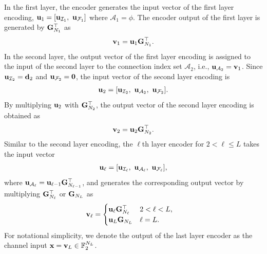 \documentclass[conference]{IEEEtran}
\begin{document}


 In the first layer, the encoder generates the input vector of the first layer encoding, ${\bf u}_{1}=[  {\bf u}_{\mathcal{I}_{1}},~{\bf u}_{\mathcal{F}_{1}} ]$ where $\mathcal{A}_1=\phi$. The encoder output of the first layer is generated by ${\bf G}_{N_{1}}^{\top}$ as
\begin{align}
	{\bf v}_1 = {\bf u}_1{\bf G}_{N_{1}}^{\top}.
\end{align}
In the second layer,  the output vector of the first layer encoding is assigned to the input of the second layer to the connection index set $\mathcal{A}_2$, i.e., ${\bf u}_{\mathcal{A}_2}={\bf v}_1$. Since ${\bf u}_{\mathcal{I}_2}={\bf d}_2$ and ${\bf u}_{\mathcal{F}_2}={\bf 0}$, the input vector of the second layer encoding is 
\begin{align}
	{\bf u}_{2}=[  {\bf u}_{\mathcal{I}_{2}},~ {\bf u}_{\mathcal{A}_{2}},~{\bf u}_{\mathcal{F}_{2}} ].
\end{align} 
By multiplying ${\bf u}_{2}$ with ${\bf G}_{N_{2}}^{\top}$, the output vector of the second layer encoding is obtained as
\begin{align}
	{\bf v}_2 = {\bf u}_2 {\bf G}_{N_{2}}^{\top}.
\end{align}
Similar to the second layer encoding, the $\ell$th layer encoder for $2< \ell \leq L$ takes the input vector
\begin{align}
	{\bf u}_{\ell}=[  {\bf u}_{\mathcal{I}_{\ell}},~ {\bf u}_{\mathcal{A}_{\ell}},~{\bf u}_{\mathcal{F}_{\ell}} ],
\end{align} 
where ${\bf u}_{\mathcal{A}_{\ell}}={\bf u}_{\ell-1} {\bf G}_{N_{\ell-1}}^{\top}$, and generates the corresponding output vector by multiplying $ {\bf G}_{N_{\ell}}^{\top}$ or ${\bf G}_{N_L}$ as 
\begin{align}
{\bf v}_{\ell} &= 
\begin{cases}
	{\bf u}_{\ell}{\bf G}_{N_{\ell}}^{\top} & 2< \ell < L, \\
    {\bf u}_{L}{\bf G}_{N_{L}} & \ell = L. \\
\end{cases} \label{eq:encode}
\end{align}
For notational simplicity, we denote the output of the last layer encoder as the channel input ${\bf x}={\bf v}_L \in \mathbb{F}_2^{N_L}$.
\end{document}
